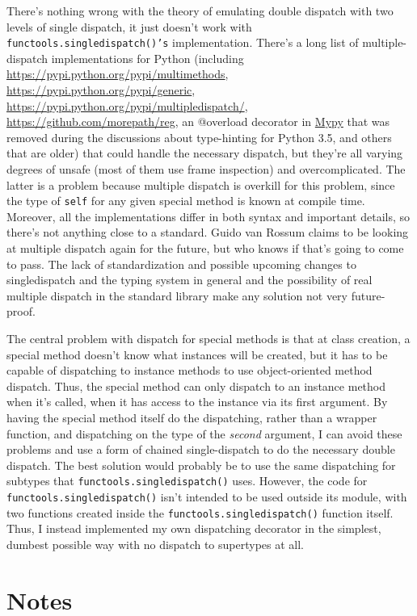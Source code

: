 \documentclass[12pt]{article}
\begin{document}
There's nothing wrong with the theory of emulating double dispatch
with two levels of single dispatch, it just doesn't work with
\texttt{functools.singledispatch()'s} implementation.  There's a long
list of multiple-dispatch implementations for Python (including
\url{https://pypi.python.org/pypi/multimethods},
\url{https://pypi.python.org/pypi/generic},
\url{https://pypi.python.org/pypi/multipledispatch/},
\url{https://github.com/morepath/reg}, an @overload decorator in
\href{http://mypy-lang.org/}{Mypy} that was removed during the
discussions about type-hinting for Python 3.5, and others that are
older) that could handle the necessary dispatch, but they're all
varying degrees of unsafe (most of them use frame inspection) and
overcomplicated.  The latter is a problem because multiple dispatch is
overkill for this problem, since the type of \texttt{self} for any
given special method is known at compile time.  Moreover, all the
implementations differ in both syntax and important details, so
there's not anything close to a standard.  Guido van Rossum claims to
be looking at multiple dispatch again for the future, but who knows if
that's going to come to pass.  The lack of standardization and
possible upcoming changes to singledispatch and the typing system in
general and the possibility of real multiple dispatch in the standard
library make any solution not very future-proof.

The central problem with dispatch for special methods is that at class
creation, a special method doesn't know what instances will be
created, but it has to be capable of dispatching to instance methods
to use object-oriented method dispatch.  Thus, the special method can
only dispatch to an instance method when it's called, when it has
access to the instance via its first argument.  By having the special
method itself do the dispatching, rather than a wrapper function, and
dispatching on the type of the \emph{second} argument, I can avoid
these problems and use a form of chained single-dispatch to do the
necessary double dispatch.  The best solution would probably be to use
the same dispatching for subtypes that
\texttt{functools.singledispatch()} uses.  However, the code for
\texttt{functools.singledispatch()} isn't intended to be used outside
its module, with two functions created inside the
\texttt{functools.singledispatch()} function itself.  Thus, I instead
implemented my own dispatching decorator in the simplest, dumbest
possible way with no dispatch to supertypes at all.


\section{Notes}
\label{sec:notes}
\end{document}

